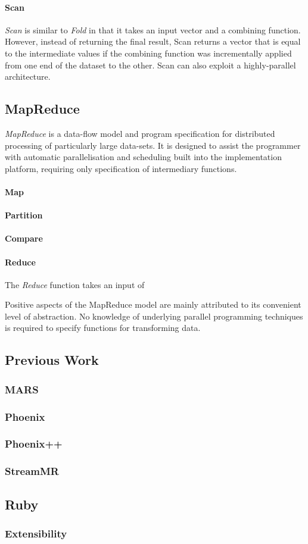 \paragraph{Scan}
\emph{Scan} is similar to \emph{Fold} in that it takes an input vector and a combining function. However, instead of returning the final result, Scan returns a vector that is equal to the intermediate values if the combining function was incrementally applied from one end of the dataset to the other. Scan can also exploit a highly-parallel architecture.
\subsection{MapReduce}
\emph{MapReduce} is a data-flow model and program specification for distributed processing of particularly large data-sets\cite{mapreduce}. It is designed to assist the programmer with automatic parallelisation and scheduling built into the implementation platform, requiring only specification of intermediary functions.
\paragraph{Map}
\paragraph{Partition}
\paragraph{Compare}
\paragraph{Reduce}
The \emph{Reduce} function takes an input of 

Positive aspects of the MapReduce model are mainly attributed to its convenient level of abstraction. No knowledge of underlying parallel programming techniques is required to specify functions for transforming data.
\subsection{Previous Work}
\subsubsection{MARS}
\subsubsection{Phoenix}
\subsubsection{Phoenix++}
\subsubsection{StreamMR}
\subsection{Ruby}
\subsubsection{Extensibility}
